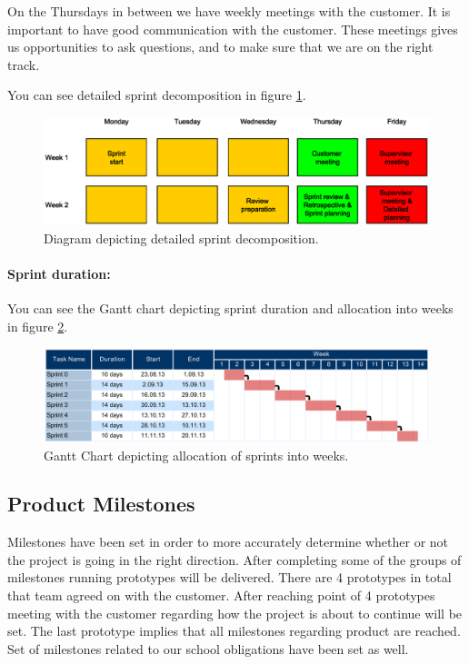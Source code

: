 On the Thursdays in between we have weekly meetings with the customer. It is important to have good communication with the customer. These meetings gives us opportunities to ask questions, and to make sure that we are on the right track.

You can see detailed sprint decomposition in figure \ref{img:sprint_detail}.
\begin{figure}[h!]
    \begin{center}
    \includegraphics[scale=0.5]{images/sprint_detail.eps}
    \caption{Diagram depicting detailed sprint decomposition.}
    \label{img:sprint_detail}
    \end{center}
\end{figure}


\paragraph{Sprint duration:}

You can see the Gantt chart depicting sprint duration and allocation into weeks in figure \ref{fig:gantt}.
\begin{figure}[!h]
	\centering
		\includegraphics[width=18cm, angle=90]{planning/gantt.pdf}
	\caption{Gantt Chart depicting allocation of sprints into weeks.}
	\label{fig:gantt}
\end{figure}

\subsection{Product Milestones}

Milestones have been set in order to more accurately determine whether or not the project is going in the right direction.
After completing some of the groups of milestones running prototypes will be delivered. 
There are 4 prototypes in total that team agreed on with the customer. 
After reaching point of 4 prototypes meeting with the customer regarding how the project is about to continue will be set. 
The last prototype implies that all milestones regarding product are reached. 
Set of milestones related to our school obligations have been set as well.

